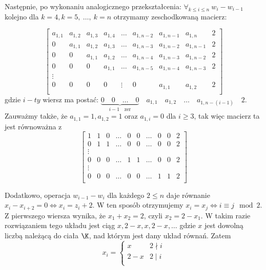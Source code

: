 \documentclass[]{sinol}
\begin{document}
\begin{zadanie}
        Następnie, po wykonaniu analogicznego przekształcenia: \(\forall_{k\leq i \leq n} \ w_i - w_{i-1}\) kolejno dla $k=4, k=5, \ \dots, \ k=n$ otrzymamy zeschodkowaną macierz:

         \[
        \begin{bmatrix}{}
            a_{1,1} & a_{1,2} & a_{1,3} & a_{1,4} & \dots & a_{1,n-2} & a_{1, n-1} & a_{1,n} & 2 \\
            0 & a_{1,1} & a_{1,2} & a_{1,3} & \dots & a_{1,n-3} & a_{1,n-2} & a_{1, n-1} & 2 \\
            0 & 0 & a_{1,1} & a_{1,2} & \dots &  a_{1,n-4} & a_{1,n-3} & a_{1, n-2} & 2 \\
            0 & 0 & 0 & a_{1,1} & \dots & a_{1,n-5} & a_{1, n-4}  & a_{1, n-3} & 2 \\
            \vdots \\
            0 & 0 & 0 & 0 & \vdots & 0 & a_{1,1} & a_{1,2} & 2 \\
        \end{bmatrix}
        \]
        gdzie $i-ty$ wiersz ma postać: $\underbrace{0 \quad 0 \quad \dots \quad 0}_{i-1 \quad \text{zer}} \quad a_{1,1} \quad a_{1,2} \quad \dots \quad a_{1,n-(i-1)} \quad 2$. Zauważmy także, że $a_{1,1}=1, a_{1,2}=1 $ oraz $ a_{1,i}=0$ dla $i \geq 3$, tak więc macierz ta jest równoważna z 
        \[
        \begin{bmatrix}
            1 & 1 & 0 & \dots & 0 & 0 & \dots & 0 & 0 & 2 \\
            0 & 1 & 1 & \dots & 0 & 0 & \dots & 0 & 0 & 2 \\
            \vdots \\
            0 & 0 & 0 & \dots & 1 & 1 & \dots & 0 & 0 & 2 \\
            \vdots \\
            0 & 0 & 0 & \dots & 0 & 0 & \dots & 1 & 1 & 2 \\
            
        \end{bmatrix}
        \]

        Dodatkowo, operacja $w_{i-1}-w_{i}$ dla każdego $2\leq n$ daje równanie $x_i - x_{i+2} = 0 \iff x_i = z_i+2$. W ten sposób otrzymujemy $x_i = x_j \iff i \equiv j \mod{2}$. Z pierwszego wiersza wynika, że $x_1 + x_2 = 2$, czyli $x_2 = 2 - x_1$. W takim razie rozwiązaniem tego układu jest ciąg $x, 2-x, x, 2-x, \dots$ gdzie $x$ jest dowolną liczbą należącą do ciała $\K$, nad którym jest dany układ równań. Zatem
        $$x_i = 
        \begin{cases}
            x & 2 \nmid i \\
            2-x & 2 \mid i \\
            \end{cases}$$
    \end{zadanie}
\end{document}
